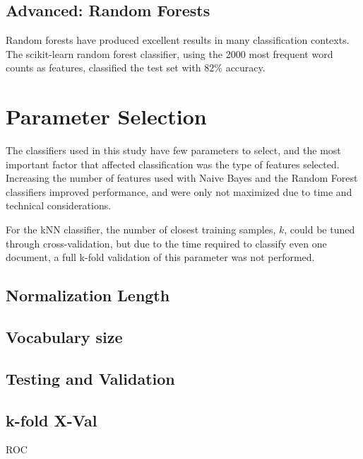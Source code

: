 \documentclass[10pt,twocolumn]{article}
\begin{document}
\subsection*{Advanced: Random Forests}

Random forests have produced excellent results in many classification contexts. The scikit-learn random forest classifier, using the 2000 most frequent word counts as features, classified the test set with $82\%$ accuracy.

\section*{Parameter Selection}

The classifiers used in this study have few parameters to select, and the most important factor that affected classification was the type of features selected.  Increasing the number of features used with Naive Bayes and the Random Forest classifiers improved performance, and were only not maximized due to time and technical considerations.

For the kNN classifier, the number of closest training samples, $k$, could be tuned through cross-validation, but due to the time required to classify even one document, a full k-fold validation of this parameter was not performed.

\subsection*{Normalization Length}

\subsection*{Vocabulary size}

\subsection*{Testing and Validation}

\subsection*{k-fold X-Val}

ROC
\end{document}
